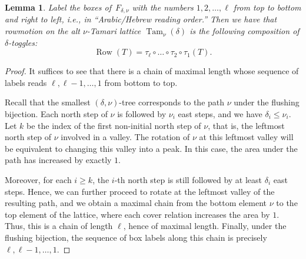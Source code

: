 \documentclass[11pt]{amsart}
\newcounter{valley}
\newcommand{\altTam}[2]{\operatorname{Tam}_{#1}(#2)}
\DeclareMathOperator{\row}{Row}
\newtheorem{lemma}[theorem]{Lemma}
\theoremstyle{definition}
\begin{document}
\begin{lemma} \label{lem:rowmotion_slow_motion}
Label the boxes of~$F_{\delta,\nu}$ with the numbers $1,2,\dots,\ell$ from top to bottom and right to left, i.e., in ``Arabic/Hebrew reading order.'' Then we have that rowmotion on the alt $\nu$-Tamari lattice $\altTam{\nu}{\delta}$ is the following composition of $\delta$-toggles: 
\[ \row(T)=\tau_\ell \circ \dots \circ \tau_2 \circ \tau_1(T). \]
\end{lemma}

\begin{proof}
It suffices to see that there is a chain of maximal length whose sequence of labels reads $\ell, \ell - 1, \dots, 1$ from bottom to top.
    
Recall that the smallest $(\delta, \nu)$-tree corresponds to the path $\nu$ under the flushing bijection. Each north step of $\nu$ is followed by $\nu_i$ east steps, and we have $\delta_i \leq \nu_i$. Let $k$ be the index of the first non-initial north step of $\nu$, that is, the leftmost north step of $\nu$ involved in a valley. The rotation of $\nu$ at this leftmost valley will be equivalent to changing this valley into a peak. In this case, the area under the path has increased by exactly $1$.

Moreover, for each $i \geq k$, the $i$-th north step is still followed by at least $\delta_i$ east steps. Hence, we can further proceed to rotate at the leftmost valley of the resulting path, and we obtain a maximal chain from the bottom element $\nu$ to the top element of the lattice, where each cover relation increases the area by $1$. Thus, this is a chain of length $\ell$, hence of maximal length. Finally, under the flushing bijection, the sequence of box labels along this chain is precisely $\ell, \ell - 1, \dots, 1$.
\end{proof}
\end{document}
